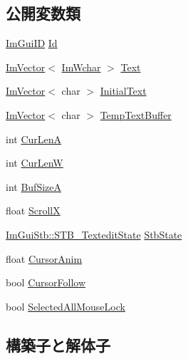 \subsection*{公開変数類}
\begin{DoxyCompactItemize}
\item 
\mbox{\hyperlink{imgui_8h_a1785c9b6f4e16406764a85f32582236f}{Im\+Gui\+ID}} \mbox{\hyperlink{struct_im_gui_text_edit_state_a72607b084143b202b03fd495b0eded2c}{Id}}
\item 
\mbox{\hyperlink{class_im_vector}{Im\+Vector}}$<$ \mbox{\hyperlink{imgui_8h_af2c7badaf05a0008e15ef76d40875e97}{Im\+Wchar}} $>$ \mbox{\hyperlink{struct_im_gui_text_edit_state_a5c387aca48db34089a3c0ff251ff06fc}{Text}}
\item 
\mbox{\hyperlink{class_im_vector}{Im\+Vector}}$<$ char $>$ \mbox{\hyperlink{struct_im_gui_text_edit_state_aba698d67719db7a6954475292cf50d28}{Initial\+Text}}
\item 
\mbox{\hyperlink{class_im_vector}{Im\+Vector}}$<$ char $>$ \mbox{\hyperlink{struct_im_gui_text_edit_state_a299fd7f0af7c81eae119d304bd0beaca}{Temp\+Text\+Buffer}}
\item 
int \mbox{\hyperlink{struct_im_gui_text_edit_state_a007dc39101b6b1cfa78dcbad828b8659}{Cur\+LenA}}
\item 
int \mbox{\hyperlink{struct_im_gui_text_edit_state_aee70a14eaf9dfb09bee698aef2de40b2}{Cur\+LenW}}
\item 
int \mbox{\hyperlink{struct_im_gui_text_edit_state_a73190bd16bf8bb58c827e66b9e28e071}{Buf\+SizeA}}
\item 
float \mbox{\hyperlink{struct_im_gui_text_edit_state_ace66da7fa5fc21a7faabe2696d366e22}{ScrollX}}
\item 
\mbox{\hyperlink{struct_im_gui_stb_1_1_s_t_b___textedit_state}{Im\+Gui\+Stb\+::\+S\+T\+B\+\_\+\+Textedit\+State}} \mbox{\hyperlink{struct_im_gui_text_edit_state_a0fb9de6739de31f44ecffce8ad239a5e}{Stb\+State}}
\item 
float \mbox{\hyperlink{struct_im_gui_text_edit_state_a743c35c5d6559183f41e09e32ae967f4}{Cursor\+Anim}}
\item 
bool \mbox{\hyperlink{struct_im_gui_text_edit_state_add85da462dc5bbb0295ae28ebec2ec5d}{Cursor\+Follow}}
\item 
bool \mbox{\hyperlink{struct_im_gui_text_edit_state_adee23632ed1703c731651b163c1f481c}{Selected\+All\+Mouse\+Lock}}
\end{DoxyCompactItemize}


\subsection{構築子と解体子}
\mbox{\label{struct_im_gui_text_edit_state_a475df87b81e95f80fa7bda77ca47d9fc}} 
